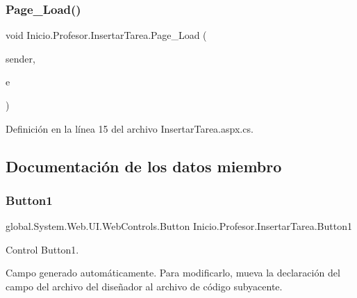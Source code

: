 \mbox{\label{classInicio_1_1Profesor_1_1InsertarTarea_a5f359452bc899f09d58aff0f147ced0e}} 
\subsubsection{\texorpdfstring{Page\_Load()}{Page\_Load()}}
{\footnotesize\ttfamily void Inicio.\+Profesor.\+Insertar\+Tarea.\+Page\+\_\+\+Load (\begin{DoxyParamCaption}\item[{object}]{sender,  }\item[{Event\+Args}]{e }\end{DoxyParamCaption})\hspace{0.3cm}{\ttfamily [protected]}}



Definición en la línea 15 del archivo Insertar\+Tarea.\+aspx.\+cs.


\begin{DoxyCode}{0}

\end{DoxyCode}


\subsection{Documentación de los datos miembro}
\mbox{\label{classInicio_1_1Profesor_1_1InsertarTarea_a1ff0562091d5590d124db0926456c867}} 
\subsubsection{\texorpdfstring{Button1}{Button1}}
{\footnotesize\ttfamily global.\+System.\+Web.\+U\+I.\+Web\+Controls.\+Button Inicio.\+Profesor.\+Insertar\+Tarea.\+Button1\hspace{0.3cm}{\ttfamily [protected]}}



Control Button1. 

Campo generado automáticamente. Para modificarlo, mueva la declaración del campo del archivo del diseñador al archivo de código subyacente. 

